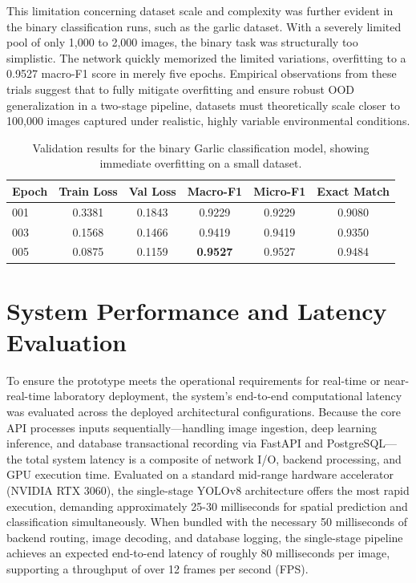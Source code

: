 This limitation concerning dataset scale and complexity was further evident in the binary classification runs, such as the garlic dataset. With a severely limited pool of only 1,000 to 2,000 images, the binary task was structurally too simplistic. The network quickly memorized the limited variations, overfitting to a 0.9527 macro-F1 score in merely five epochs. Empirical observations from these trials suggest that to fully mitigate overfitting and ensure robust OOD generalization in a two-stage pipeline, datasets must theoretically scale closer to 100,000 images captured under realistic, highly variable environmental conditions.

\begin{table}[h]
\centering
\begin{tabular}{l c c c c c}
\hline
Epoch & Train Loss & Val Loss & Macro-F1 & Micro-F1 & Exact Match \\
\hline
001 & 0.3381 & 0.1843 & 0.9229 & 0.9229 & 0.9080 \\
003 & 0.1568 & 0.1466 & 0.9419 & 0.9419 & 0.9350 \\
005 & 0.0875 & 0.1159 & \textbf{0.9527} & 0.9527 & 0.9484 \\
\hline
\end{tabular}
\caption{Validation results for the binary Garlic classification model, showing immediate overfitting on a small dataset.}
\label{tab:garlic_classification}
\end{table}


\section{System Performance and Latency Evaluation}
\label{sec:ch6-perf}

To ensure the prototype meets the operational requirements for real-time or near-real-time laboratory deployment, the system's end-to-end computational latency was evaluated across the deployed architectural configurations. Because the core API processes inputs sequentially—handling image ingestion, deep learning inference, and database transactional recording via FastAPI and PostgreSQL—the total system latency is a composite of network I/O, backend processing, and GPU execution time. Evaluated on a standard mid-range hardware accelerator (NVIDIA RTX 3060), the single-stage YOLOv8 architecture offers the most rapid execution, demanding approximately 25-30 milliseconds for spatial prediction and classification simultaneously. When bundled with the necessary 50 milliseconds of backend routing, image decoding, and database logging, the single-stage pipeline achieves an expected end-to-end latency of roughly 80 milliseconds per image, supporting a throughput of over 12 frames per second (FPS). 

